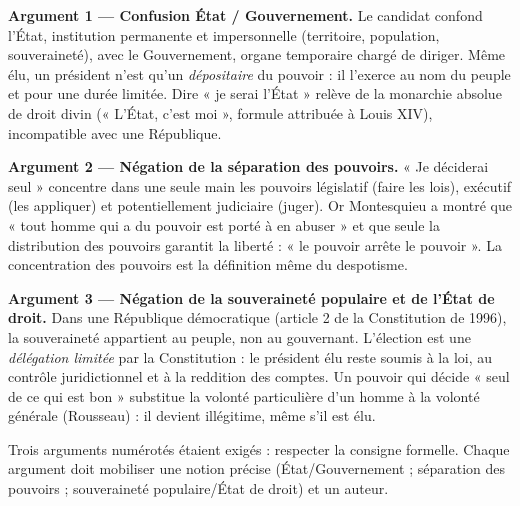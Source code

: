 \documentclass[11pt]{article}
\newcommand{\cle}[1]{{\popxbold\color{popdark}#1}}
\begin{document}
\begin{corrige}
\textbf{Argument 1 — Confusion État / Gouvernement.} Le candidat confond l'État, institution permanente et impersonnelle (territoire, population, souveraineté), avec le Gouvernement, organe temporaire chargé de diriger. Même élu, un président n'est qu'un \emph{dépositaire} du pouvoir : il l'exerce au nom du peuple et pour une durée limitée. Dire « je serai l'État » relève de la monarchie absolue de droit divin (« L'État, c'est moi », formule attribuée à Louis XIV), incompatible avec une République.

\textbf{Argument 2 — Négation de la séparation des pouvoirs.} « Je déciderai seul » concentre dans une seule main les pouvoirs législatif (faire les lois), exécutif (les appliquer) et potentiellement judiciaire (juger). Or Montesquieu a montré que « tout homme qui a du pouvoir est porté à en abuser » et que seule la distribution des pouvoirs garantit la liberté : « le pouvoir arrête le pouvoir ». La concentration des pouvoirs est la définition même du \cle{despotisme}.

\textbf{Argument 3 — Négation de la souveraineté populaire et de l'État de droit.} Dans une République démocratique (article 2 de la Constitution de 1996), la souveraineté appartient au peuple, non au gouvernant. L'élection est une \emph{délégation limitée} par la Constitution : le président élu reste soumis à la loi, au contrôle juridictionnel et à la reddition des comptes. Un pouvoir qui décide « seul de ce qui est bon » substitue la volonté particulière d'un homme à la volonté générale (Rousseau) : il devient illégitime, même s'il est élu.
\end{corrige}

\begin{attention}
Trois arguments numérotés étaient exigés : respecter la consigne formelle. Chaque argument doit mobiliser une notion précise (État/Gouvernement ; séparation des pouvoirs ; souveraineté populaire/État de droit) et un auteur.
\end{attention}
\end{document}
